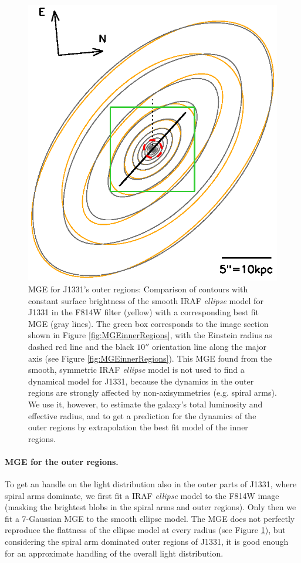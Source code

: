 \begin{figure}
\centering
\includegraphics[width=0.8\columnwidth]{fig/1331F814W_MGE_disk_L.ps}
\caption{MGE for J1331's outer regions: Comparison of contours with constant surface brightness of the smooth IRAF \emph{ellipse} model for J1331 in the F814W filter (yellow) with a corresponding best fit MGE (gray lines). The green box corresponds to the image section shown in Figure \ref{fig:MGEinnerRegions}, with the Einstein radius as dashed red line and the black $10''$ orientation line along the major axis (see Figure \ref{fig:MGEinnerRegions}). This MGE found from the smooth, symmetric IRAF \emph{ellipse} model is not used to find a dynamical model for J1331, because the dynamics in the outer regions are strongly affected by non-axisymmetries (e.g. spiral arms). We use it, however, to estimate the galaxy's total luminosity and effective radius, and to get a prediction for the dynamics of the outer regions by extrapolation the best fit model of the inner regions. }
\label{fig:MGEouterRegions}
\end{figure}

\paragraph{MGE for the outer regions.} To get an handle on the light distribution also in the outer parts of J1331, where spiral arms dominate, we first fit a IRAF \citep{1993ASPC...52..173T} \emph{ellipse} model to the F814W image (masking the brightest blobs in the spiral arms and outer regions). Only then we fit a 7-Gaussian MGE to the smooth ellipse model. The MGE does not perfectly reproduce the flattness of the ellipse model at every radius (see Figure \ref{fig:MGEouterRegions}), but considering the spiral arm dominated outer regions of J1331, it is good enough for an approximate handling of the overall light distribution.

